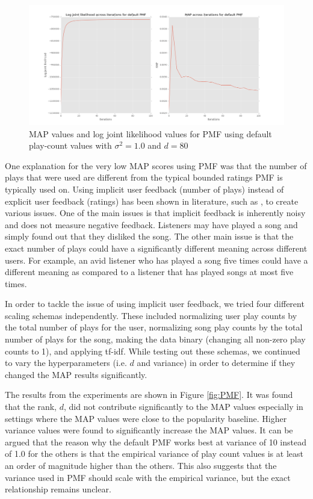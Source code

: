 \documentclass[11pt,preprint]{aastex}
\begin{document}
\begin{figure}[H] %
   \centering
   \includegraphics[width=6in]{../plots/final/defaultPMF.png} 
   \caption{MAP values and log joint likelihood values for PMF using default play-count values with $\sigma^2 = 1.0$ and $d = 80$}
   \label{defaultPMF}
\end{figure}
 
One explanation for the very low MAP scores using PMF was that the number of plays that were used are different from the typical bounded ratings PMF is typically used on. Using implicit user feedback (number of plays) instead of explicit user feedback (ratings) has been shown in literature, such as \citet{hu2008collaborative}, to create various issues. One of the main issues is that implicit feedback is inherently noisy and does not measure negative feedback. Listeners may have played a song and simply found out that they disliked the song. The other main issue is that the exact number of plays could have a significantly different meaning across different users. For example, an avid listener who has played a song five times could have a different meaning as compared to a listener that has played songs at most five times.
 
In order to tackle the issue of using implicit user feedback, we tried four different scaling schemas independently. These included normalizing user play counts by the total number of plays for the user, normalizing song play counts by the total number of plays for the song, making the data binary (changing all non-zero play counts to 1), and applying tf-idf. While testing out these schemas, we continued to vary the hyperparameters (i.e. $d$ and variance) in order to determine if they changed the MAP results significantly. 
 
The results from the experiments are shown in Figure \ref{fig:PMF}. It was found that the rank, $d$, did not contribute significantly to the MAP values especially in settings where the MAP values were close to the popularity baseline. Higher variance values were found to significantly increase the MAP values. It can be argued that the reason why the default PMF works best at variance of 10 instead of 1.0 for the others is that the empirical variance of play count values is at least an order of magnitude higher than the others. This also suggests that the variance used in PMF should scale with the empirical variance, but the exact relationship remains unclear.
\end{document}
